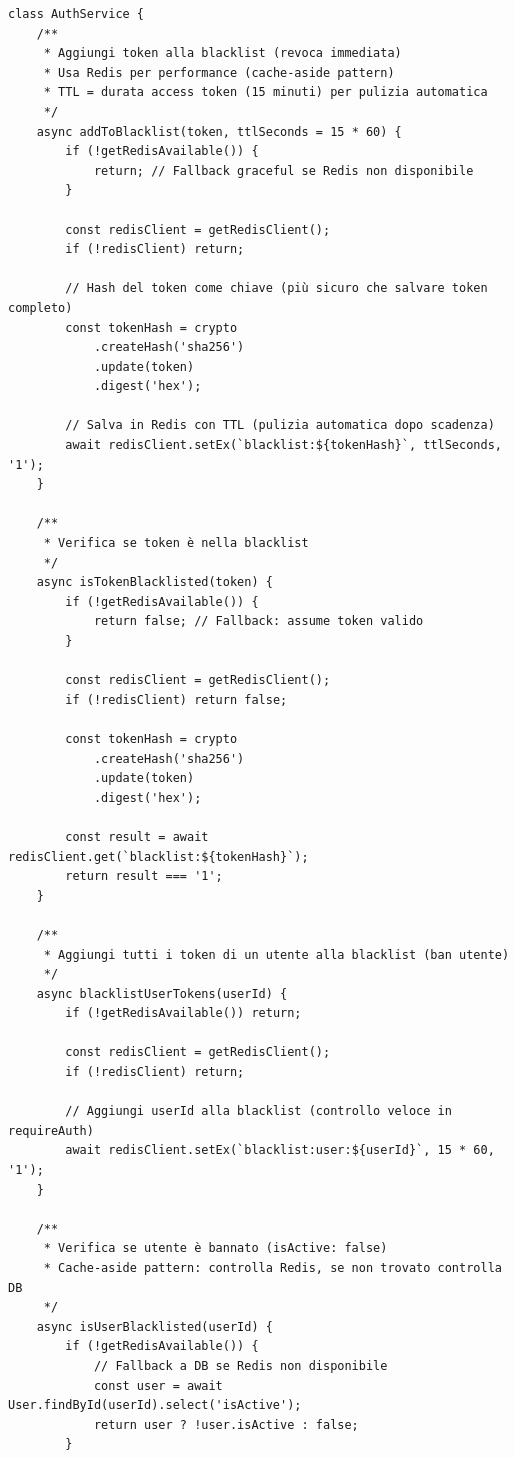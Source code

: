 \documentclass[11pt,a4paper]{article}
\begin{document}
\begin{lstlisting}[caption=Blacklist Redis per Token Revocati]
class AuthService {
    /**
     * Aggiungi token alla blacklist (revoca immediata)
     * Usa Redis per performance (cache-aside pattern)
     * TTL = durata access token (15 minuti) per pulizia automatica
     */
    async addToBlacklist(token, ttlSeconds = 15 * 60) {
        if (!getRedisAvailable()) {
            return; // Fallback graceful se Redis non disponibile
        }

        const redisClient = getRedisClient();
        if (!redisClient) return;

        // Hash del token come chiave (più sicuro che salvare token completo)
        const tokenHash = crypto
            .createHash('sha256')
            .update(token)
            .digest('hex');

        // Salva in Redis con TTL (pulizia automatica dopo scadenza)
        await redisClient.setEx(`blacklist:${tokenHash}`, ttlSeconds, '1');
    }

    /**
     * Verifica se token è nella blacklist
     */
    async isTokenBlacklisted(token) {
        if (!getRedisAvailable()) {
            return false; // Fallback: assume token valido
        }

        const redisClient = getRedisClient();
        if (!redisClient) return false;

        const tokenHash = crypto
            .createHash('sha256')
            .update(token)
            .digest('hex');

        const result = await redisClient.get(`blacklist:${tokenHash}`);
        return result === '1';
    }

    /**
     * Aggiungi tutti i token di un utente alla blacklist (ban utente)
     */
    async blacklistUserTokens(userId) {
        if (!getRedisAvailable()) return;

        const redisClient = getRedisClient();
        if (!redisClient) return;

        // Aggiungi userId alla blacklist (controllo veloce in requireAuth)
        await redisClient.setEx(`blacklist:user:${userId}`, 15 * 60, '1');
    }

    /**
     * Verifica se utente è bannato (isActive: false)
     * Cache-aside pattern: controlla Redis, se non trovato controlla DB
     */
    async isUserBlacklisted(userId) {
        if (!getRedisAvailable()) {
            // Fallback a DB se Redis non disponibile
            const user = await User.findById(userId).select('isActive');
            return user ? !user.isActive : false;
        }


\end{lstlisting}
\end{document}
